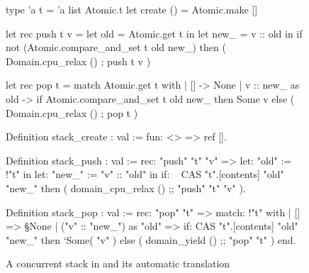 \begin{figure}[tp]
\begin{minipage}[t]{0.42\textwidth}
\begin{ocamlcode}
type 'a t = 'a list Atomic.t
let create () = Atomic.make []

let rec push t v =
  let old = Atomic.get t in
  let new_ = v :: old in
  if not (Atomic.compare_and_set
            t old new_)
  then (
    Domain.cpu_relax () ;
    push t v
  )

let rec pop t =
  match Atomic.get t with
  | [] -> None
  | v :: new_ as old ->
      if Atomic.compare_and_set
           t old new_
      then Some v
      else (
        Domain.cpu_relax () ;
        pop t
      )
\end{ocamlcode}
\end{minipage}
\begin{minipage}[t]{0.49\textwidth}
\begin{coqcode}
Definition stack_create : val :=
  fun: <> => ref [].

Definition stack_push : val :=
  rec: "push" "t" "v" =>
    let: "old" := !"t" in
    let: "new_" := "v" :: "old" in
    if: ~ CAS "t".[contents] "old" "new_"
    then (
      domain_cpu_relax () ;;
      "push" "t" "v"
    ).

Definition stack_pop : val :=
  rec: "pop" "t" =>
    match: !"t" with
    | [] => §None
    | ("v" :: "new_") as "old" =>
        if: CAS "t".[contents] "old" "new_"
        then ‘Some( "v" )
        else (
          domain_yield () ;;
          "pop" "t"
        )
    end.

\end{coqcode}
\end{minipage}

\caption{A concurrent stack in \OCaml and its automatic \ZooLang translation}
\label{fig:stack}
\end{figure}

